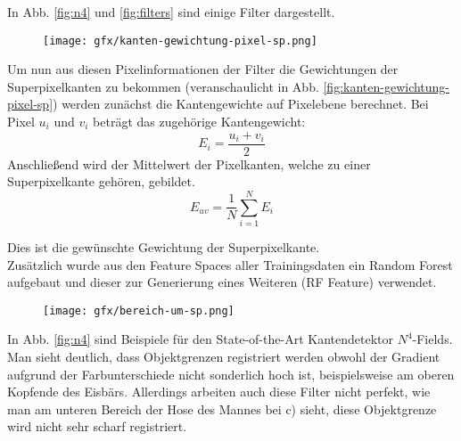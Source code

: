 In Abb. \ref{fig:n4} und \ref{fig:filters} sind einige Filter dargestellt. 

\newpage

\begin{figure}[H]
	\centering
	\texttt{[image: gfx/kanten-gewichtung-pixel-sp.png]}
\end{figure}
\label{fig:kanten-gewichtung-pixel-sp}
\vspace{0.5cm}

Um nun aus diesen Pixelinformationen der Filter die Gewichtungen der Superpixelkanten zu bekommen (veranschaulicht in Abb. \ref{fig:kanten-gewichtung-pixel-sp}) werden zunächst die Kantengewichte auf Pixelebene berechnet. Bei Pixel $u_i$ und $v_i$ beträgt das zugehörige Kantengewicht:
\begin{equation}
	E_{i}=\frac{u_i+v_i}{2}
\end{equation} 
Anschließend wird der Mittelwert der Pixelkanten, welche zu einer Superpixelkante gehören, gebildet. 
\begin{equation}
E_{uv} = \frac{1}{N} \sum\limits_{i=1}^{N} E_i
\end{equation}

Dies ist die gewünschte Gewichtung der Superpixelkante. \\


Zusätzlich wurde aus den Feature Spaces aller Trainingsdaten ein Random Forest aufgebaut und dieser zur Generierung eines Weiteren (RF Feature) verwendet.

\vspace{1cm}

\begin{figure}[H]
	\centering
	\texttt{[image: gfx/bereich-um-sp.png]}
\end{figure}
\label{fig:var-bereich-sp}
\vspace{0.5cm}

In Abb. \ref{fig:n4} sind Beispiele für den State-of-the-Art Kantendetektor $N^4$-Fields. Man sieht deutlich, dass Objektgrenzen registriert werden obwohl der Gradient aufgrund der Farbunterschiede nicht sonderlich hoch ist, beispielsweise am oberen Kopfende des Eisbärs. Allerdings arbeiten auch diese Filter nicht perfekt, wie man am unteren Bereich der Hose des Mannes bei c) sieht, diese Objektgrenze wird nicht sehr scharf registriert. 

